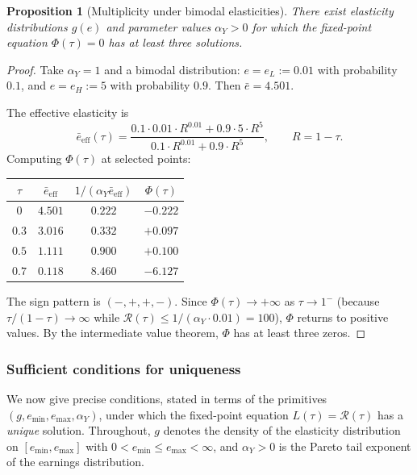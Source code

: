 \documentclass[12pt,a4paper]{article}
\theoremstyle{definition}
\theoremstyle{plain}
\newtheorem{proposition}{Proposition}[section]
\theoremstyle{remark}
\newcommand{\calR}{\mathcal{R}}
\begin{document}
\begin{proposition}[Multiplicity under bimodal elasticities]
\label{prop:2D_multiplicity}
There exist elasticity distributions $g(e)$ and parameter values $\alpha_Y > 0$ for which the fixed-point equation $\Phi(\tau) = 0$ has at least three solutions.
\end{proposition}

\begin{proof}
Take $\alpha_Y = 1$ and a bimodal distribution: $e = e_L := 0.01$ with probability $0.1$, and $e = e_H := 5$ with probability $0.9$.  Then $\bar{e} = 4.501$.

The effective elasticity is
\[
  \bar{e}_{\mathrm{eff}}(\tau) = \frac{0.1 \cdot 0.01 \cdot R^{0.01} + 0.9 \cdot 5 \cdot R^{5}}{0.1 \cdot R^{0.01} + 0.9 \cdot R^{5}}, \qquad R = 1-\tau.
\]
Computing $\Phi(\tau)$ at selected points:
\begin{center}
\begin{tabular}{c|cc|c}
\hline
$\tau$ & $\bar{e}_{\mathrm{eff}}$ & $1/(\alpha_Y\bar{e}_{\mathrm{eff}})$ & $\Phi(\tau)$ \\
\hline
$0$   & $4.501$ & $0.222$ & $-0.222$ \\
$0.3$ & $3.016$ & $0.332$ & $+0.097$ \\
$0.5$ & $1.111$ & $0.900$ & $+0.100$ \\
$0.7$ & $0.118$ & $8.460$ & $-6.127$ \\
\hline
\end{tabular}
\end{center}
The sign pattern is $(-,+,+,-)$.  Since $\Phi(\tau) \to +\infty$ as $\tau \to 1^-$ (because $\tau/(1-\tau) \to \infty$ while $\calR(\tau) \leq 1/(\alpha_Y \cdot 0.01) = 100$), $\Phi$ returns to positive values.  By the intermediate value theorem, $\Phi$ has at least three zeros.
\end{proof}

\subsubsection{Sufficient conditions for uniqueness}
\label{sec:2D_uniqueness}

We now give precise conditions, stated in terms of the primitives
$(g, e_{\min}, e_{\max}, \alpha_Y)$, under which the fixed-point
equation $L(\tau) = \calR(\tau)$ has a \emph{unique} solution.
Throughout, $g$ denotes the density of the elasticity distribution
on $[e_{\min}, e_{\max}]$ with
$0 < e_{\min} \leq e_{\max} < \infty$, and $\alpha_Y > 0$ is the
Pareto tail exponent of the earnings distribution.
\end{document}
